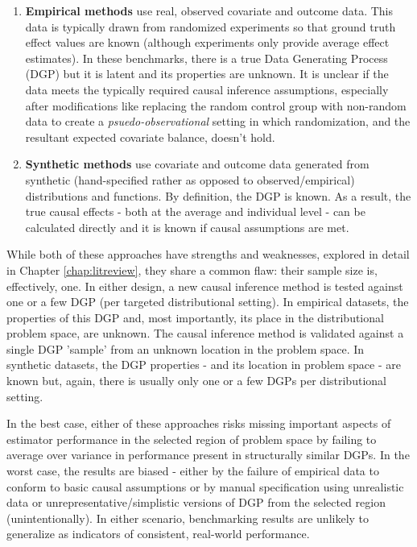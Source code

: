\documentclass[../main.tex]{subfiles}
\begin{document}
\begin{enumerate}
    \item \textbf{Empirical methods} use real, observed covariate and outcome data. This data is typically drawn from randomized experiments so that ground truth effect values are known (although experiments only provide average effect estimates). In these benchmarks, there is a true Data Generating Process (DGP) but it is latent and its properties are unknown. It is unclear if the data meets the typically required causal inference assumptions, especially after modifications like replacing the random control group with non-random data to create a \textit{psuedo-observational} setting in which randomization, and the resultant expected covariate balance, doesn't hold.

    \item \textbf{Synthetic methods} use covariate and outcome data generated from synthetic (hand-specified rather as opposed to observed/empirical) distributions and functions. By definition, the DGP is known. As a result, the true causal effects - both at the average and individual level - can be calculated directly and it is known if causal assumptions are met.
\end{enumerate}

While both of these approaches have strengths and weaknesses, explored in detail in Chapter \ref{chap:litreview}, they share a common flaw: their sample size is, effectively, one. In either design, a new causal inference method is tested against one or a few DGP (per targeted distributional setting). In empirical datasets, the properties of this DGP and, most importantly, its place in the distributional problem space, are unknown. The causal inference method is validated against a single DGP 'sample' from an unknown location in the problem space. In synthetic datasets, the DGP properties - and its location in problem space - are known but, again, there is usually only one or a few DGPs per distributional setting.

\vspace{\baselineskip}

In the best case, either of these approaches risks missing important aspects of estimator performance in the selected region of problem space by failing to average over variance in performance present in structurally similar DGPs. In the worst case, the results are biased - either by the failure of empirical data to conform to basic causal assumptions or by manual specification using unrealistic data or unrepresentative/simplistic versions of DGP from the selected region (unintentionally). In either scenario, benchmarking results are unlikely to generalize as indicators of consistent, real-world performance.
\end{document}
